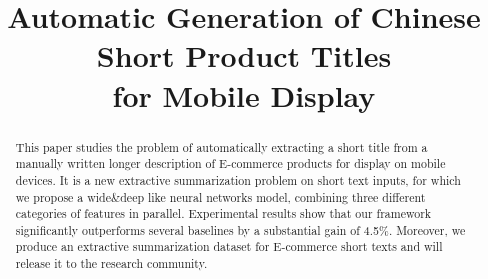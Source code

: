 \documentclass[sigconf,anonymous]{acmart}
\begin{document}
\title{Automatic Generation of Chinese Short Product Titles \\ for Mobile Display}







\renewcommand{\shortauthors}{B. Trovato et al.}

\begin{abstract}
	This paper studies the problem of automatically extracting a short 
	title from a manually written longer description of E-commerce products
	for display on mobile devices. 
	It is a new extractive summarization problem on short text inputs,
	for which we propose a wide\&deep like neural networks model, combining three 
	different categories of features in parallel. 
	Experimental results show that our framework significantly outperforms 
	several baselines by a substantial gain of 4.5\%.
	Moreover, we produce an extractive summarization dataset for E-commerce 
	short texts and will release it to the research community.
\end{abstract}

%
%






\maketitle

\begin{CJK}{UTF8}{gbsn}
	
	
	
	
	
	
	
	
	
	
	
	
	
	
	
\end{CJK}



\end{document}
